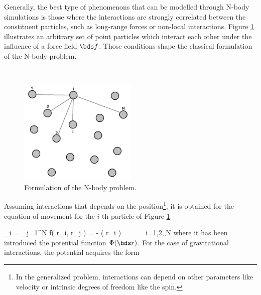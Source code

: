 Generally, the best type of phenomenons that can be modelled through N-body
simulations is those where the interactions are strongly correlated between
the constituent particles, such as long-range forces or non-local 
interactions. Figure \ref{fig:NbodyProblem} illustrates an arbitrary set of
point particles which interact each other under the influence of a force 
field $\bds f$. Those conditions shape the classical formulation of the
N-body problem.


\
\begin{figure}[htbp]
	\centering
	\includegraphics[width=0.50\textwidth]
	{./figures/3_nbody_simulations/Nbody_Problem.png}

	\caption{\small{Formulation of the N-body problem.}}
	
	\label{fig:NbodyProblem}
\end{figure}


Assuming interactions that depends on the position\footnote{ In the 
generalized problem, interactions can depend on other parameters like 
velocity or intrinsic degrees of freedom like the spin.}, it is obtained
for the equation of movement for the $i$-th particle of Figure 
\ref{fig:NbodyProblem} \cite{pfalzner1996} \cite{binney2008} 


{ _i = \sum_{j=1}^N \bds f( \bds r_i, \bds r_j ) = -\nabla 
\phi( \bds r_i )\ \ \ \ \ \ \ i=1,2,\cdots,N }
where it has been introduced the potential function $\Phi(\bds r)$. For
the case of gravitational interactions, the potential acquires the form



